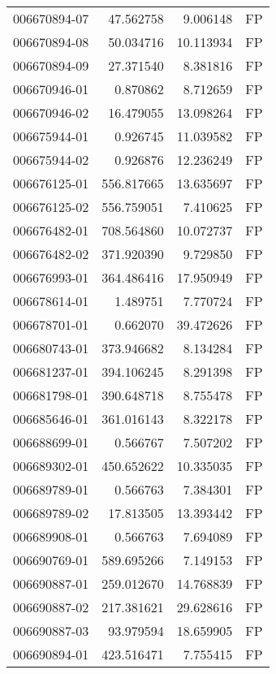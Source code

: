 \begin{tabular}{lrrl}
006670894-07 &   47.562758 &       9.006148 &   FP \\
006670894-08 &   50.034716 &      10.113934 &   FP \\
006670894-09 &   27.371540 &       8.381816 &   FP \\
006670946-01 &    0.870862 &       8.712659 &   FP \\
006670946-02 &   16.479055 &      13.098264 &   FP \\
006675944-01 &    0.926745 &      11.039582 &   FP \\
006675944-02 &    0.926876 &      12.236249 &   FP \\
006676125-01 &  556.817665 &      13.635697 &   FP \\
006676125-02 &  556.759051 &       7.410625 &   FP \\
006676482-01 &  708.564860 &      10.072737 &   FP \\
006676482-02 &  371.920390 &       9.729850 &   FP \\
006676993-01 &  364.486416 &      17.950949 &   FP \\
006678614-01 &    1.489751 &       7.770724 &   FP \\
006678701-01 &    0.662070 &      39.472626 &   FP \\
006680743-01 &  373.946682 &       8.134284 &   FP \\
006681237-01 &  394.106245 &       8.291398 &   FP \\
006681798-01 &  390.648718 &       8.755478 &   FP \\
006685646-01 &  361.016143 &       8.322178 &   FP \\
006688699-01 &    0.566767 &       7.507202 &   FP \\
006689302-01 &  450.652622 &      10.335035 &   FP \\
006689789-01 &    0.566763 &       7.384301 &   FP \\
006689789-02 &   17.813505 &      13.393442 &   FP \\
006689908-01 &    0.566763 &       7.694089 &   FP \\
006690769-01 &  589.695266 &       7.149153 &   FP \\
006690887-01 &  259.012670 &      14.768839 &   FP \\
006690887-02 &  217.381621 &      29.628616 &   FP \\
006690887-03 &   93.979594 &      18.659905 &   FP \\
006690894-01 &  423.516471 &       7.755415 &   FP \\

\end{tabular}
